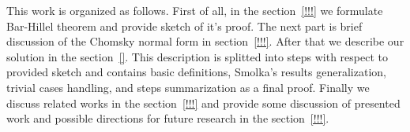 This work is organized as follows. 
First of all, in the section~\ref{!!!} we formulate Bar-Hillel theorem and provide sketch of it's proof.
The next part is brief discussion of the Chomsky normal form in section~\ref{!!!}.
After that we describe our solution in the section~\ref{}.
This description is splitted into steps with respect to provided sketch and contains basic definitions, Smolka's results generalization, trivial cases handling, and steps summarization as a final proof.
Finally we discuss related works in the section~\ref{!!!} and provide some discussion of presented work and possible directions for future research in the section~\ref{!!!}.

